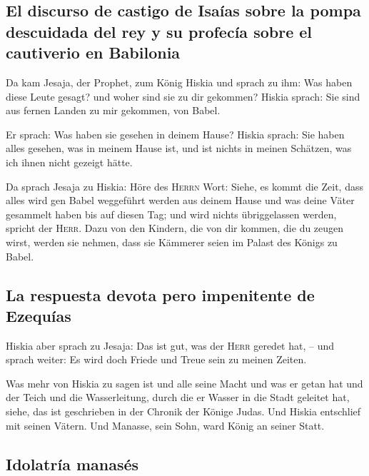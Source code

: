 \hypertarget{el-discurso-de-castigo-de-isauxedas-sobre-la-pompa-descuidada-del-rey-y-su-profecuxeda-sobre-el-cautiverio-en-babilonia}{%
\subsection{El discurso de castigo de Isaías sobre la pompa descuidada
del rey y su profecía sobre el cautiverio en
Babilonia}\label{el-discurso-de-castigo-de-isauxedas-sobre-la-pompa-descuidada-del-rey-y-su-profecuxeda-sobre-el-cautiverio-en-babilonia}}

 Da kam Jesaja, der Prophet, zum König Hiskia und sprach
zu ihm: Was haben diese Leute gesagt? und woher sind sie zu dir
gekommen? Hiskia sprach: Sie sind aus fernen Landen zu mir gekommen, von
Babel.

 Er sprach: Was haben sie gesehen in deinem Hause? Hiskia
sprach: Sie haben alles gesehen, was in meinem Hause ist, und ist nichts
in meinen Schätzen, was ich ihnen nicht gezeigt hätte.

 Da sprach Jesaja zu Hiskia: Höre des \textsc{Herrn}
Wort:  Siehe, es kommt die Zeit, dass alles wird gen
Babel weggeführt werden aus deinem Hause und was deine Väter gesammelt
haben bis auf diesen Tag; und wird nichts übriggelassen werden, spricht
der \textsc{Herr}.  Dazu von den Kindern, die von dir
kommen, die du zeugen wirst, werden sie nehmen, dass sie Kämmerer seien
im Palast des Königs zu Babel.

\hypertarget{la-respuesta-devota-pero-impenitente-de-ezequuxedas}{%
\subsection{La respuesta devota pero impenitente de
Ezequías}\label{la-respuesta-devota-pero-impenitente-de-ezequuxedas}}

 Hiskia aber sprach zu Jesaja: Das ist gut, was der
\textsc{Herr} geredet hat, -- und sprach weiter: Es wird doch Friede und
Treue sein zu meinen Zeiten.

 Was mehr von Hiskia zu sagen ist und alle seine Macht
und was er getan hat und der Teich und die Wasserleitung, durch die er
Wasser in die Stadt geleitet hat, siehe, das ist geschrieben in der
Chronik der Könige Judas.  Und Hiskia entschlief mit
seinen Vätern. Und Manasse, sein Sohn, ward König an seiner Statt.

\hypertarget{idolatruxeda-manasuxe9s}{%
\subsection{Idolatría manasés}\label{idolatruxeda-manasuxe9s}}

